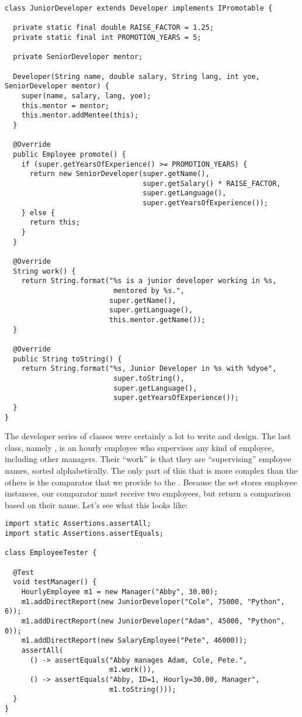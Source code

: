 \enlargethispage{-8\baselineskip}
\begin{lstlisting}[language=MyJava]
class JuniorDeveloper extends Developer implements IPromotable {

  private static final double RAISE_FACTOR = 1.25;
  private static final int PROMOTION_YEARS = 5;

  private SeniorDeveloper mentor;

  Developer(String name, double salary, String lang, int yoe, SeniorDeveloper mentor) {
    super(name, salary, lang, yoe);
    this.mentor = mentor;
    this.mentor.addMentee(this);
  }

  @Override
  public Employee promote() {
    if (super.getYearsOfExperience() >= PROMOTION_YEARS) {
      return new SeniorDeveloper(super.getName(), 
                                 super.getSalary() * RAISE_FACTOR, 
                                 super.getLanguage(), 
                                 super.getYearsOfExperience());
    } else {
      return this;
    }
  }

  @Override
  String work() {
    return String.format("%s is a junior developer working in %s, 
                          mentored by %s.", 
                         super.getName(),
                         super.getLanguage(),
                         this.mentor.getName());
  }

  @Override
  public String toString() {
    return String.format("%s, Junior Developer in %s with %dyoe", 
                          super.toString(),
                          super.getLanguage(),
                          super.getYearsOfExperience());
  }
}
\end{lstlisting}

The developer series of classes were certainly a lot to write and design. The last class, namely , is an hourly employee who supervises any kind of employee, including other managers. Their ``work'' is that they are ``supervising'' employee names, sorted alphabetically. The only part of this that is more complex than the others is the comparator that we provide to the . Because the set stores employee instances, our comparator must receive two employees, but return a comparison based on their name. Let's see what this looks like:

\enlargethispage{-7\baselineskip}
\begin{lstlisting}[language=MyJava]
import static Assertions.assertAll;
import static Assertions.assertEquals;

class EmployeeTester {

  @Test
  void testManager() {
    HourlyEmployee m1 = new Manager("Abby", 30.00);
    m1.addDirectReport(new JuniorDeveloper("Cole", 75000, "Python", 6));
    m1.addDirectReport(new JuniorDeveloper("Adam", 45000, "Python", 0));
    m1.addDirectReport(new SalaryEmployee("Pete", 46000));
    assertAll(
      () -> assertEquals("Abby manages Adam, Cole, Pete.", 
                         m1.work()),
      () -> assertEquals("Abby, ID=1, Hourly=30.00, Manager", 
                         m1.toString()));
  }
}
\end{lstlisting}

